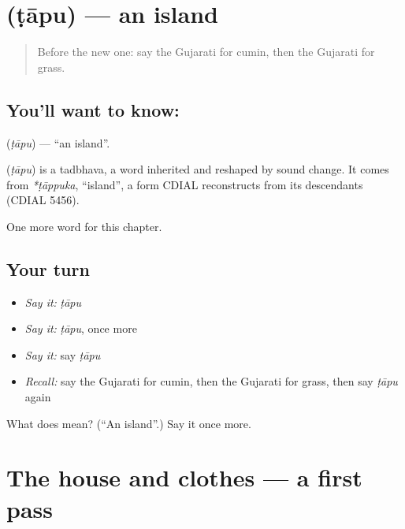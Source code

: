 \section[\texorpdfstring{\gu{ટાપુ} (ṭāpu)}{ટાપુ (ṭāpu)}]{ (ṭāpu) — an island}

\label{lesson:GU-C118-tapu}



\begin{quote}
Before the new one: say the Gujarati for cumin, then the Gujarati for grass.
\end{quote}

\subsection*{You'll want to know: }
\textbf{} (\emph{ṭāpu}) — \textquotedblleft{}an island\textquotedblright{}.

\begin{cousinweb}
\textbf{} (\emph{ṭāpu}) is a tadbhava, a word inherited and reshaped by sound change. It comes from \emph{*ṭāppuka}, \textquotedblleft{}island\textquotedblright{}, a form CDIAL reconstructs from its descendants (CDIAL 5456).
\end{cousinweb}

\begin{grammarlens}[title={What you've built}]
One more word for this chapter.
\end{grammarlens}

\subsection*{Your turn}
\begin{itemize}
\raggedright
  \item \emph{Say it:} \emph{ṭāpu}
  \item \emph{Say it:} \emph{ṭāpu}, once more
  \item \emph{Say it:} say \emph{ṭāpu}
  \item \emph{Recall:} say the Gujarati for cumin, then the Gujarati for grass, then say \emph{ṭāpu} again
\end{itemize}

\begin{tcolorbox}[breakable,colback=teal!4,colframe=teal!35!black,title={Before you move on}]
What does  mean? (\textquotedblleft{}An island\textquotedblright{}.) Say it once more.
\end{tcolorbox}
\section[(dialogue)]{The house and clothes — a first pass}

